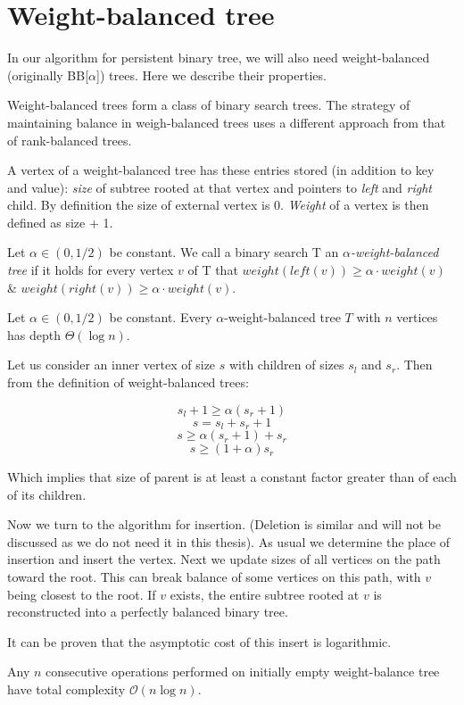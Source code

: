 \section{Weight-balanced tree}

In our algorithm for persistent binary tree, we will also need weight-balanced (originally BB[$\alpha$]) trees. Here we describe their properties.

Weight-balanced trees form a class of binary search trees. The strategy of maintaining balance in weigh-balanced trees uses a different approach from that of rank-balanced trees.

A vertex of a weight-balanced tree has these entries stored (in addition to key and value): {\em size} of subtree rooted at that vertex and pointers to {\em left} and {\em right} child. By definition the size of external vertex is 0. {\em Weight} of a vertex is then defined as size + 1.

\begin{defn}
Let $\alpha \in (0,1/2)$ be constant. We call a binary search T an {\em $\alpha$-weight-balanced tree} if it holds for every vertex $v$ of T that $weight(left(v)) \geq \alpha \cdot weight(v)$ \& $weight(right(v)) \geq \alpha \cdot weight(v) $.
\end{defn}

\begin{prop}
Let $\alpha \in (0,1/2)$ be constant. Every $\alpha$-weight-balanced tree $T$ with $n$ vertices has depth $\Theta(\log n)$. 
\end{prop}

\begin{myproof}
Let us consider an inner vertex of size $s$ with children of sizes $s_l$ and $s_r$. Then from the definition of weight-balanced trees:

$$s_l + 1 \geq \alpha (s_r+1)$$
$$ s = s_l + s_r + 1 $$
$$ s \geq \alpha (s_r+1) + s_r $$
$$ s \geq (1+\alpha)s_r $$

Which implies that size of parent is at least a constant factor greater than of each of its children.
\end{myproof}

Now we turn to the algorithm for insertion. (Deletion is similar and will not be discussed as we do not need it in this thesis). As usual we determine the place of insertion and insert the vertex. Next we update sizes of all vertices on the path toward the root. This can break balance of some vertices on this path, with $v$ being closest to the root. If $v$ exists, the entire subtree rooted at $v$ is reconstructed into a perfectly balanced binary tree.

It can be proven that the asymptotic cost of this insert is logarithmic.

\begin{prop}
Any $n$ consecutive operations performed on initially empty weight-balance tree have total complexity $\mathcal{O}(n \log n)$. 
\end{prop}